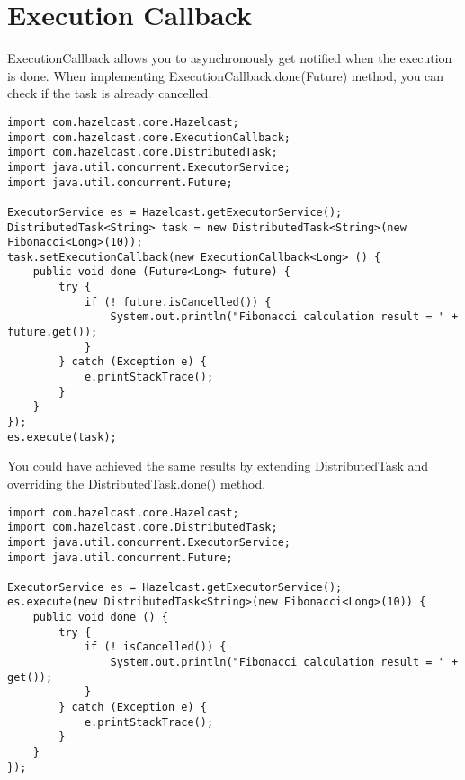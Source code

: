 \section{Execution Callback}

ExecutionCallback allows you to asynchronously get notified when the execution is done. When implementing ExecutionCallback.done(Future) method, you can check if the task is already cancelled.

\begin{verbatim}
import com.hazelcast.core.Hazelcast;
import com.hazelcast.core.ExecutionCallback;
import com.hazelcast.core.DistributedTask;
import java.util.concurrent.ExecutorService;    
import java.util.concurrent.Future; 
        
ExecutorService es = Hazelcast.getExecutorService();
DistributedTask<String> task = new DistributedTask<String>(new Fibonacci<Long>(10));
task.setExecutionCallback(new ExecutionCallback<Long> () {
    public void done (Future<Long> future) { 
        try {
            if (! future.isCancelled()) {
                System.out.println("Fibonacci calculation result = " + future.get());
            }
        } catch (Exception e) {
            e.printStackTrace();
        }
    }
});
es.execute(task);
\end{verbatim}

You could have achieved the same results by extending DistributedTask and overriding the DistributedTask.done() method.

\begin{verbatim}
import com.hazelcast.core.Hazelcast;
import com.hazelcast.core.DistributedTask;
import java.util.concurrent.ExecutorService;    
import java.util.concurrent.Future; 
        
ExecutorService es = Hazelcast.getExecutorService();
es.execute(new DistributedTask<String>(new Fibonacci<Long>(10)) {
    public void done () { 
        try {
            if (! isCancelled()) {
                System.out.println("Fibonacci calculation result = " + get());
            }
        } catch (Exception e) {
            e.printStackTrace();
        }
    }
}); 
\end{verbatim}

